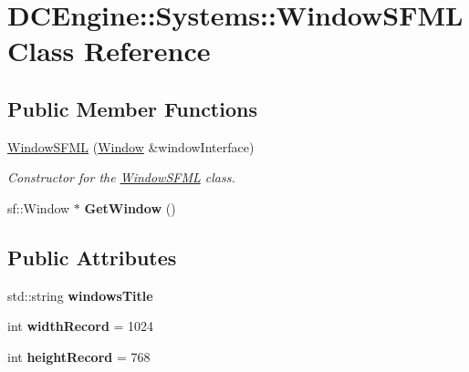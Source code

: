\hypertarget{classDCEngine_1_1Systems_1_1WindowSFML}{\section{D\-C\-Engine\-:\-:Systems\-:\-:Window\-S\-F\-M\-L Class Reference}
\label{classDCEngine_1_1Systems_1_1WindowSFML}
}
\subsection*{Public Member Functions}
\begin{DoxyCompactItemize}
\item 
\hypertarget{classDCEngine_1_1Systems_1_1WindowSFML_aa146757cf6b118d293a2afd04435cf46}{\hyperlink{classDCEngine_1_1Systems_1_1WindowSFML_aa146757cf6b118d293a2afd04435cf46}{Window\-S\-F\-M\-L} (\hyperlink{classDCEngine_1_1Systems_1_1Window}{Window} \&window\-Interface)}\label{classDCEngine_1_1Systems_1_1WindowSFML_aa146757cf6b118d293a2afd04435cf46}

\begin{DoxyCompactList}\small\item\em Constructor for the \hyperlink{classDCEngine_1_1Systems_1_1WindowSFML}{Window\-S\-F\-M\-L} class. \end{DoxyCompactList}\item 
\hypertarget{classDCEngine_1_1Systems_1_1WindowSFML_af2f775c3baa3e3f926d7043721b15482}{sf\-::\-Window $\ast$ {\bfseries Get\-Window} ()}\label{classDCEngine_1_1Systems_1_1WindowSFML_af2f775c3baa3e3f926d7043721b15482}

\end{DoxyCompactItemize}
\subsection*{Public Attributes}
\begin{DoxyCompactItemize}
\item 
\hypertarget{classDCEngine_1_1Systems_1_1WindowSFML_afa03b33994df07ffe45e513b0ff6d854}{std\-::string {\bfseries windows\-Title}}\label{classDCEngine_1_1Systems_1_1WindowSFML_afa03b33994df07ffe45e513b0ff6d854}

\item 
\hypertarget{classDCEngine_1_1Systems_1_1WindowSFML_adf57babc6fbe16e56bb7eeb4e281d969}{int {\bfseries width\-Record} = 1024}\label{classDCEngine_1_1Systems_1_1WindowSFML_adf57babc6fbe16e56bb7eeb4e281d969}

\item 
\hypertarget{classDCEngine_1_1Systems_1_1WindowSFML_ae05156e6c992fa8a7538ad32b23d9b01}{int {\bfseries height\-Record} = 768}\label{classDCEngine_1_1Systems_1_1WindowSFML_ae05156e6c992fa8a7538ad32b23d9b01}

\end{DoxyCompactItemize}
